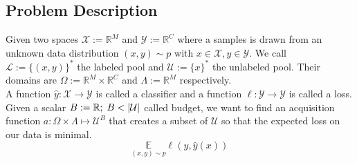\documentclass[]{article}
\begin{document}


\subsection{Problem Description}
Given two spaces $\mathcal{X}:=\mathbb{R}^M$ and $\mathcal{Y}:=\mathbb{R}^C$ where a samples is drawn from an unknown data distribution $(x, y) \sim p$ with $x \in \mathcal{X}, y \in \mathcal{Y}$.
We call $\mathcal{L} := \{ (x, y) \}^*$ the labeled pool and $\mathcal{U} := \{ x \}^*$ the unlabeled pool.
Their domains are $\Omega := \mathbb{R}^M \times \mathbb{R}^C$ and $\Lambda := \mathbb{R}^M$ respectively. \\
A function $\hat y: \mathcal{X} \rightarrow \mathcal{Y}$ is called a classifier and a function $\ell: \mathcal{Y} \rightarrow \mathcal{Y}$ is called a loss.
Given a scalar $B := \mathbb{R}; \hspace{1mm} B < |\mathcal{U}|$ called budget, we want to find an acquisition function $a: \Omega \times \Lambda \mapsto \mathcal{U}^B$ that creates a subset of $\mathcal{U}$ so that the expected loss on our data is minimal.
$$
\underset{(x,y)\sim p}{\mathbb{E}} \ell(y, \hat y(x))
$$


\end{document}
